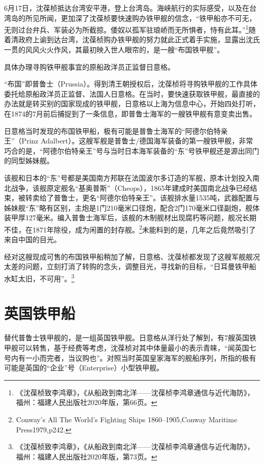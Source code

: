 \documentclass[12pt,UTF8]{ctexbook}
\begin{document}
6月17日，沈葆桢抵达台湾安平港，登上台湾岛。海峡航行的实际感受，以及在台湾岛的所见所闻，更加深了沈葆桢要快速购办铁甲舰的信念，“铁甲船亦不可无，无则过台弁兵、军装必为所截掠。倭奴以孤军驻琅峤而无所惧者，恃有此耳。”\footnote{《沈葆桢致李鸿章》，《从船政到南北洋——沈葆桢李鸿章通信与近代海防》，福州：福建人民出版社2020年版，第66页。}随着清政府上谕到达台湾，沈葆桢购办铁甲舰的努力就此正式着手实施，显露出沈氏一贯的风风火火作风，其最初映入世人眼帘的，是一艘“布国铁甲舰”。

具体办理寻购铁甲舰事宜的原船政洋员正监督日意格。

“布国”即普鲁士（Prussia）。得到清王朝授权后，沈葆桢将寻购铁甲舰的工作具体委托给原船政洋员正监督、法国人日意格。在当时，要快速获取铁甲舰，最直接的办法就是转买别的国家现成的铁甲舰，日意格以上海为信息中心，开始四处打听，在1874的7月前后捕捉到了一条信息，即普鲁士海军的一艘铁甲舰有意变卖出售。

日意格当时发现的布国铁甲船，极有可能是普鲁士海军的“阿德尔伯特亲王”（Prinz Adalbert）。这艘军舰是普鲁士/德国海军装备的第一艘铁甲舰，非常巧合的是，“阿德尔伯特亲王”号与当时日本海军装备的“东”号铁甲舰还是源出同门的同型姊妹舰。

该舰和日本的“东”号都是美国南方邦联在法国波尔多订造的军舰，原本计划投入南北战争，该舰原定舰名“基奥普斯”（Cheops），1865年建成时美国南北战争已经结束，被转卖给了普鲁士，更名“阿德尔伯特亲王”。该舰排水量1535吨，武器配置与姊妹舰“东”略有区别，主炮是1门210毫米口径炮，配合2门170毫米口径副炮，舰体装甲厚127毫米。编入普鲁士海军后，该舰的木制舰材出现腐朽等问题，舰况长期不佳，在1871年除役，成为闲置的封存舰。\footnote{Conway's All The World's Fighting Ships 1860--1905,Conway Maritime Press1979,p242.}未能料到的是，几年之后竟然吸引了来自中国的目光。

经对这艘现成可售的布国铁甲船稍加了解，日意格、沈葆桢都发现了这艘军舰舰况太差的问题，立刻打消了转购的念头，调整目光，寻找新的目标，“日耳曼铁甲船水缸太旧，不可用”。\footnote{《沈葆桢致李鸿章》，《从船政到南北洋——沈葆桢李鸿章通信与近代海防》，福州：福建人民出版社2020年版，第73页。}

\section{英国铁甲船}

替代普鲁士铁甲舰的，是一组英国铁甲舰。日意格从洋行处了解到，有7艘英国铁甲舰可以转售，基于经费等考虑，沈葆桢对其中体量最小的表示青睐，“闻英国七号内有一小而完者，当议购也”。对照当时英国皇家海军的舰船序列，所指的极有可能是英国的“企业”号（Enterprise）小型铁甲舰。
\end{document}
